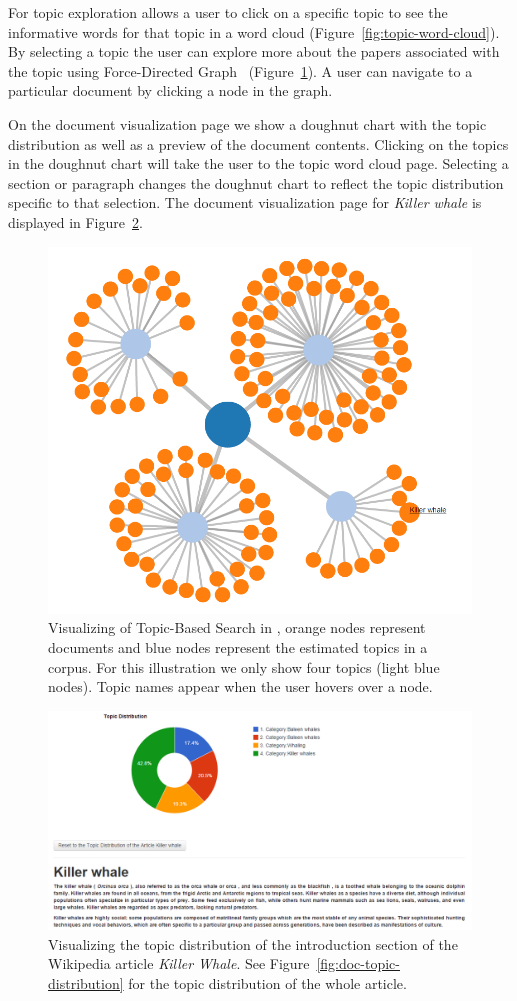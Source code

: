 For topic exploration \system allows a user to click on a specific 
topic to see the informative words for that topic in a word cloud 
(Figure~\ref{fig:topic-word-cloud}). By selecting a topic the user 
can explore more about the papers associated with the topic using 
Force-Directed Graph~\cite{2011-d3} (Figure~\ref{fig:topic-search-viz}).
A user can navigate to a particular document by clicking a node in 
the graph. 

On the document visualization page we show a doughnut chart with the topic distribution as well as a preview of the document contents.
Clicking on the topics in the doughnut chart will take the user to the topic word cloud page.
Selecting a section or paragraph changes the doughnut chart to reflect the topic distribution specific to that selection.
The document visualization page for \textit{Killer whale} is displayed in Figure~\ref{fig:doc-para-viz}.





\begin{figure}[htb]\centering 
\includegraphics[width=.5\textwidth]{images/topical_docs.png}
\caption{Visualizing of Topic-Based Search in \system, orange 
nodes represent documents and blue nodes represent the estimated 
topics in a corpus. For this illustration we only show four topics 
(light blue nodes). Topic names appear when the user hovers over a 
node.}
\label{fig:topic-search-viz}
\end{figure}

\begin{figure}[htb]\centering 
\includegraphics[width=1\textwidth]{images/para_topic_distribution.png}
\caption{Visualizing the topic distribution of the introduction 
section of the Wikipedia article \textit{Killer Whale}. See Figure~\ref{fig:doc-topic-distribution} for the topic distribution of 
the whole article.}
\label{fig:doc-para-viz}
\end{figure}

